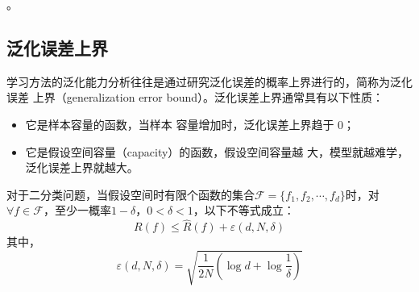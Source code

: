 。
\subsection{泛化误差上界}
学习方法的泛化能力分析往往是通过研究泛化误差的概率上界进行的，简称为泛化误差
上界（generalization error bound）。泛化误差上界通常具有以下性质：
\begin{itemize}
    \item 它是样本容量的函数，当样本
          容量增加时，泛化误差上界趋于 0；
    \item 它是假设空间容量（capacity）的函数，假设空间容量越
          大，模型就越难学，泛化误差上界就越大。
\end{itemize}

\begin{theorem}[泛化误差上界]
    对于二分类问题，当假设空间时有限个函数的集合$\mathcal{F}=\{f_1, f_2, \cdots, f_d\}$时，对$\forall f\in \mathcal{F}$，至少一概率$1-\delta$，$0<\delta<1$，以下不等式成立：
    \begin{equation}
        R(f)\leq\hat{R}(f)+\varepsilon(d,N,\delta)
    \end{equation}
    其中，
    \begin{equation}
        \varepsilon(d,N,\delta)=\sqrt{\frac{1}{2N}(\log d+\log \frac{1}{\delta})}
    \end{equation}
\end{theorem}